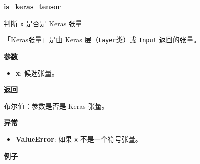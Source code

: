 \textbf{is\_keras\_tensor}\label{isux5fkerasux5ftensor}

\begin{Shaded}
\begin{Highlighting}[]
\end{Highlighting}
\end{Shaded}

判断 \texttt{x} 是否是 Keras 张量

「Keras张量」是由 Keras 层（\texttt{Layer}类）或 \texttt{Input}
返回的张量。

\textbf{参数}

\begin{itemize}
\tightlist
\item
  \textbf{x}: 候选张量。
\end{itemize}

\textbf{返回}

布尔值：参数是否是 Keras 张量。

\textbf{异常}

\begin{itemize}
\tightlist
\item
  \textbf{ValueError}: 如果 \texttt{x} 不是一个符号张量。
\end{itemize}

\textbf{例子}

